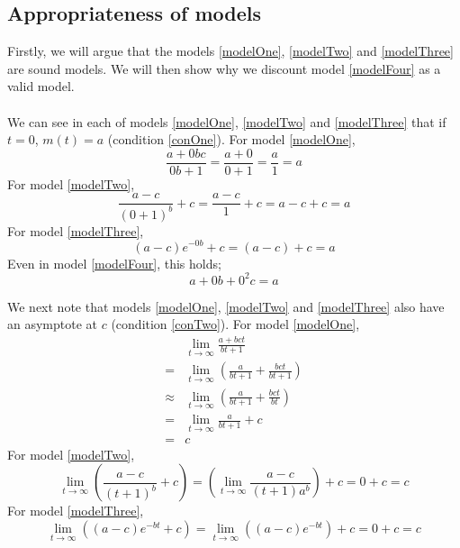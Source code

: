 \subsection{Appropriateness of models} \label{subsecAppropriateness}

Firstly, we will argue that the models \ref{modelOne}, \ref{modelTwo} and
\ref{modelThree} are sound models.
We will then show why we discount model \ref{modelFour} as a valid model.\\
\\
We can see in each of models \ref{modelOne}, \ref{modelTwo} and \ref{modelThree}
that if $t = 0$, $m(t) = a$ (condition \ref{conOne}).
For model \ref{modelOne},
\begin{equation}
  \frac{a+0bc}{0b+1} = \frac{a + 0}{0+1} = \frac{a}{1} = a
\end{equation}
For model \ref{modelTwo},
\begin{equation}
  \frac{a-c}{(0+1)^{b}}+c = \frac{a-c}{1}+c = a-c+c = a
\end{equation}
For model \ref{modelThree},
\begin{equation}
  (a-c) e^{-0b} + c = (a-c) + c = a
\end{equation}
Even in model \ref{modelFour}, this holds;
\begin{equation}
  a + 0b + 0^2c = a
\end{equation}

We next note that models \ref{modelOne}, \ref{modelTwo} and \ref{modelThree}
also have an asymptote at $c$ (condition \ref{conTwo}).
For model \ref{modelOne},
\begin{align}
  &\lim_{t \to \infty} \frac{a+bct}{bt+1} \\
    =& \lim_{t \to \infty} (\frac{a}{bt+1} +
      \frac{bct}{bt+1})\\ \approx&\lim_{t \to \infty} (\frac{a}{bt+1} +
        \frac{bct}{bt})\\ =& \lim_{t \to \infty} \frac{a}{bt+1} + c\\ = &c
\end{align}
For model \ref{modelTwo},
\begin{equation}
  \lim_{t \to \infty} (\frac{a-c}{(t+1)^{b}}+c) = (\lim_{t \to \infty}
  \frac{a-c}{(t+1)a^{b}}) + c = 0 + c = c
\end{equation}
For model \ref{modelThree},
\begin{equation}
  \lim_{t \to \infty} ((a-c) e^{-bt} + c) = \lim_{t \to \infty} ((a-c) e^{-bt})
  + c = 0 + c = c
\end{equation}

